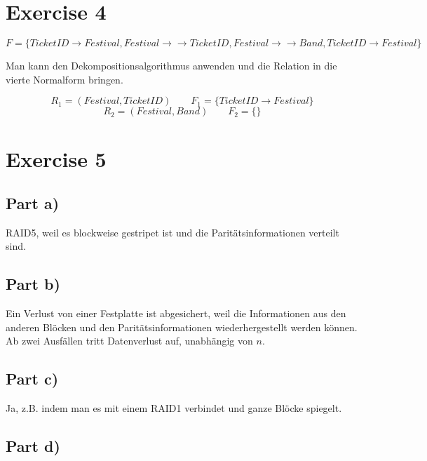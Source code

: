 \documentclass[10pt,a4paper]{article}
\begin{document}
\section*{Exercise 4}

\begin{equation*}
  F = \{ TicketID \rightarrow Festival, Festival \rightarrow \rightarrow TicketID, Festival \rightarrow \rightarrow Band, TicketID \rightarrow Festival \}
\end{equation*}

Man kann den Dekompositionsalgorithmus anwenden und die Relation in die vierte Normalform bringen.

\begin{equation*}
  R_{1} = (Festival, TicketID) \qquad F_{1} = \{ TicketID \rightarrow Festival \}
\end{equation*}
\begin{equation*}
  R_{2} = (Festival, Band) \qquad F_{2} = \{  \}
\end{equation*}

\section*{Exercise 5}

\subsection*{Part a)}

RAID5, weil es blockweise gestripet ist und die Paritätsinformationen verteilt sind.

\subsection*{Part b)}

Ein Verlust von einer Festplatte ist abgesichert, weil die Informationen aus den anderen Blöcken und den Paritätsinformationen wiederhergestellt werden können.
Ab zwei Ausfällen tritt Datenverlust auf, unabhängig von $n$.

\subsection*{Part c)}

Ja, z.B. indem man es mit einem RAID1 verbindet und ganze Blöcke spiegelt.

\subsection*{Part d)}
\end{document}
